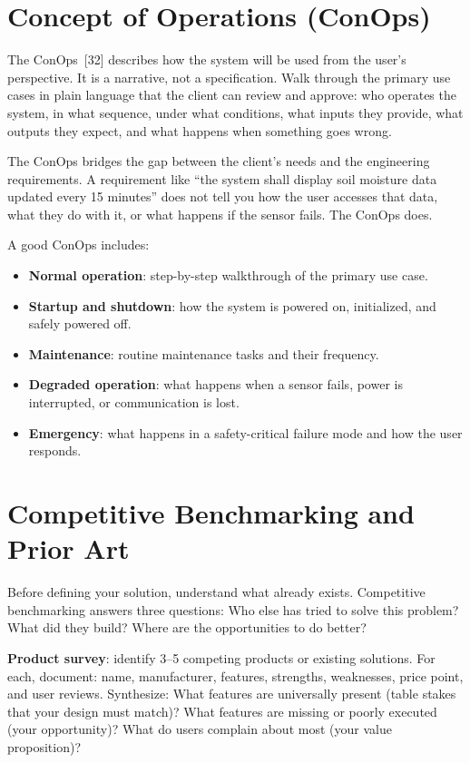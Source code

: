 \section{Concept of Operations (ConOps)}
The ConOps~[32] describes how the system will be used from the user's perspective. It is a narrative, not a specification. Walk through the primary use cases in plain language that the client can review and approve: who operates the system, in what sequence, under what conditions, what inputs they provide, what outputs they expect, and what happens when something goes wrong.

The ConOps bridges the gap between the client's needs and the engineering requirements. A requirement like ``the system shall display soil moisture data updated every 15 minutes'' does not tell you how the user accesses that data, what they do with it, or what happens if the sensor fails. The ConOps does.

A good ConOps includes:
\begin{itemize}[nosep,leftmargin=1.5em]
\item \textbf{Normal operation}: step-by-step walkthrough of the primary use case.
\item \textbf{Startup and shutdown}: how the system is powered on, initialized, and safely powered off.
\item \textbf{Maintenance}: routine maintenance tasks and their frequency.
\item \textbf{Degraded operation}: what happens when a sensor fails, power is interrupted, or communication is lost.
\item \textbf{Emergency}: what happens in a safety-critical failure mode and how the user responds.
\end{itemize}

\section{Competitive Benchmarking and Prior Art}
Before defining your solution, understand what already exists. Competitive benchmarking answers three questions: Who else has tried to solve this problem? What did they build? Where are the opportunities to do better?

\textbf{Product survey}: identify 3--5 competing products or existing solutions. For each, document: name, manufacturer, features, strengths, weaknesses, price point, and user reviews. Synthesize: What features are universally present (table stakes that your design must match)? What features are missing or poorly executed (your opportunity)? What do users complain about most (your value proposition)?

